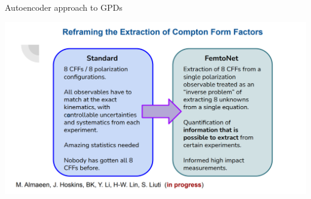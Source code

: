 \documentclass[aspectratio=169]{beamer}
\newcommand*{\myfont}{\fontfamily{lmtt}\selectfont}
\begin{document}
\begin{frame}{Autoencoder approach to GPDs}

  \includegraphics[scale=0.52832]{janres/vain2.png}
\end{frame}


%
%
%



%    




\end{document}
